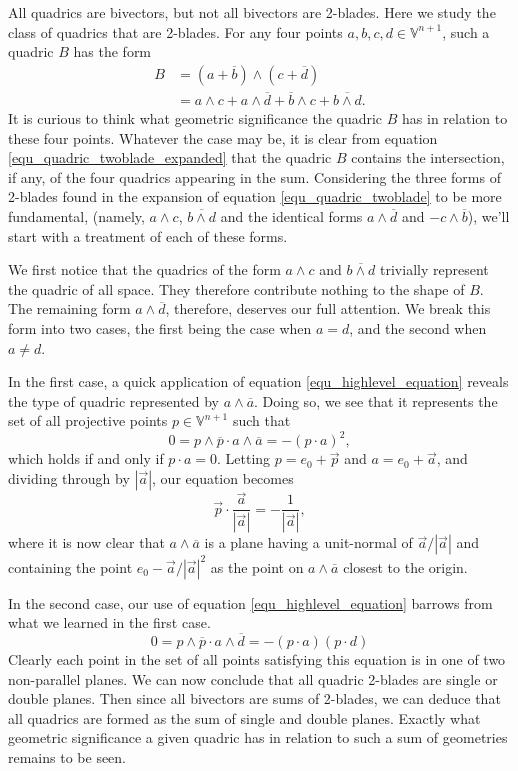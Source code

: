 \documentclass{ecgd-l}
\theoremstyle{definition}
\theoremstyle{remark}
\numberwithin{equation}{section}
\newcommand{\V}{\mathbb{V}}
\begin{document}
All quadrics are bivectors, but not all bivectors are 2-blades.  Here
we study the class of quadrics that are 2-blades.  For any four
points $a,b,c,d\in\V^{n+1}$, such a quadric $B$ has the form
\begin{align}
B &= (a+\overline{b})\wedge(c+\overline{d})\label{equ_quadric_twoblade} \\
 &= a\wedge c + a\wedge\overline{d} + \overline{b}\wedge c + \overline{b\wedge d}.\label{equ_quadric_twoblade_expanded}
\end{align}
It is curious to think what geometric significance the quadric $B$ has in relation
to these four points.  Whatever the case may be, it is clear from equation
\eqref{equ_quadric_twoblade_expanded} that the quadric $B$ contains the intersection, if any,
of the four quadrics appearing in the sum.  Considering the three forms of 2-blades
found in the expansion of equation \eqref{equ_quadric_twoblade} to be more
fundamental, (namely, $a\wedge c$, $\overline{b\wedge d}$ and
the identical forms $a\wedge\overline{d}$ and $-c\wedge\overline{b}$), we'll
start with a treatment of each of these forms.

We first notice that the quadrics of the form $a\wedge c$ and $\overline{b\wedge d}$
trivially represent the quadric of all space.  They therefore contribute nothing
to the shape of $B$.  The remaining form $a\wedge\overline{d}$, therefore,
deserves our full attention.  We break this form into two cases, the first being
the case when $a=d$, and the second when $a\neq d$.

In the first case, a quick application of equation
\eqref{equ_highlevel_equation} reveals the type of quadric
represented by $a\wedge\overline{a}$.  Doing so, we see that it represents
the set of all projective points $p\in\V^{n+1}$ such that
\begin{equation}
0=p\wedge\overline{p}\cdot a\wedge\overline{a}=-(p\cdot a)^2,
\end{equation}
which holds if and only if $p\cdot a=0$.
Letting $p=e_0+\vec{p}$ and $a=e_0+\vec{a}$, and dividing through
by $|\vec{a}|$, our equation becomes
\begin{equation}
\vec{p}\cdot\frac{\vec{a}}{|\vec{a}|} = -\frac{1}{|\vec{a}|},
\end{equation}
where it is now clear that $a\wedge\overline{a}$ is a plane having
a unit-normal of $\vec{a}/|\vec{a}|$ and containing the point $e_0-\vec{a}/|\vec{a}|^2$
as the point on $a\wedge\overline{a}$ closest to the origin.

In the second case, our use of equation \eqref{equ_highlevel_equation} barrows
from what we learned in the first case.
\begin{equation}
0 = p\wedge\overline{p}\cdot a\wedge\overline{d} = -(p\cdot a)(p\cdot d)
\end{equation}
Clearly each point in the set of all points satisfying this equation is in
one of two non-parallel planes.  We can now conclude that all quadric
2-blades are single or double planes.  Then since all bivectors are sums
of 2-blades, we can deduce that all quadrics are formed as the sum
of single and double planes.  Exactly what geometric significance a given
quadric has in relation to such a sum of geometries remains to be seen.
\end{document}
